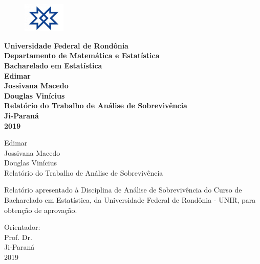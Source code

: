 \documentclass[a4paper, oneside]{book}\usepackage[]{graphicx}\usepackage[]{color}
\begin{document}



\begin{titlepage} %
	\begin{center} %
		\begin{figure}[!htb]
			\includegraphics[width=2cm]{img/unir-logo}
			\centering
		\end{figure}
		{\large \bf Universidade Federal de Rondônia}\\[0.35cm] 
		{\large \bf Departamento de Matemática e Estatística}\\[0.35cm] 
		{\large \bf Bacharelado em Estatística}\\[2.5cm]  
		
		{\large \bf Edimar \\ Jossivana Macedo \\ Douglas Vinícius}\\[5cm]
		{\bf \huge Relatório do Trabalho de Análise de Sobrevivência}\\[9.5cm] %
		{\large \bf Ji-Paraná}\\[0.2cm]
		{\large \bf 2019}
	\end{center}
\end{titlepage}



\begin{titlepage}
	\vfill 
	\begin{center}
		{\large Edimar \\ Jossivana Macedo \\ Douglas Vinícius} \\[5cm]
		{\Huge  Relatório do Trabalho de Análise de Sobrevivência}\\[4.0cm]
		\hspace{.45\textwidth} %
		\begin{minipage}{.45\textwidth}
Relatório apresentado à Disciplina de Análise de Sobrevivência do Curso de Bacharelado em Estatística, da Universidade Federal de Rondônia - UNIR, para obtenção de aprovação.
		\end{minipage}
		\vfill
		{\large Orientador:\\ Prof. Dr. 
		}\\[1.0cm]
		{\large Ji-Paraná}\\[0.2cm]
		{\large 2019}
	\end{center}
\end{titlepage}
\end{document}
